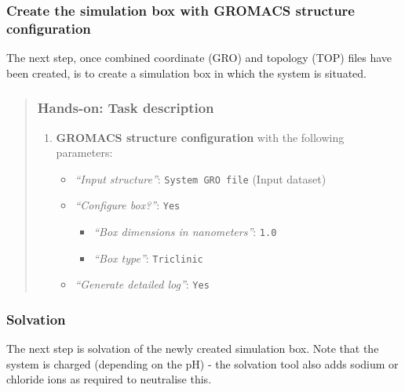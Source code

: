 \documentclass[twocolumn]{bmcart}%
\providecommand{\tightlist}{%
  \setlength{\itemsep}{0pt}\setlength{\parskip}{0pt}}
\providecommand{\tightlist}{%
  \setlength{\itemsep}{0pt}\setlength{\parskip}{0pt}}
\begin{document}

\subsubsection{\texorpdfstring{Create the simulation box with
\textbf{GROMACS structure
configuration}}{Create the simulation box with GROMACS structure configuration}}\label{create-the-simulation-box-with-gromacs-structure-configuration}

The next step, once combined coordinate (GRO) and topology (TOP) files
have been created, is to create a simulation box in which the system is
situated.

\begin{quote}
\hypertarget{hands-on-task-description-3}{%
\subsubsection{Hands-on: Task
description}\label{hands-on-task-description-3}}

\begin{enumerate}
\def\labelenumi{\arabic{enumi}.}
\tightlist
\item
  \textbf{GROMACS structure configuration} with the following
  parameters:

  \begin{itemize}
  \tightlist
  \item
    \emph{``Input structure''}: \texttt{System\ GRO\ file} (Input
    dataset)
  \item
    \emph{``Configure box?''}: \texttt{Yes}

    \begin{itemize}
    \tightlist
    \item
      \emph{``Box dimensions in nanometers''}: \texttt{1.0}
    \item
      \emph{``Box type''}: \texttt{Triclinic}
    \end{itemize}
  \item
    \emph{``Generate detailed log''}: \texttt{Yes}
  \end{itemize}
\end{enumerate}

\end{quote}

\subsubsection{Solvation}\label{solvation}
The next step is solvation of the newly created simulation box. Note
that the system is charged (depending on the pH) - the solvation tool
also adds sodium or chloride ions as required to neutralise this.
\end{document}
